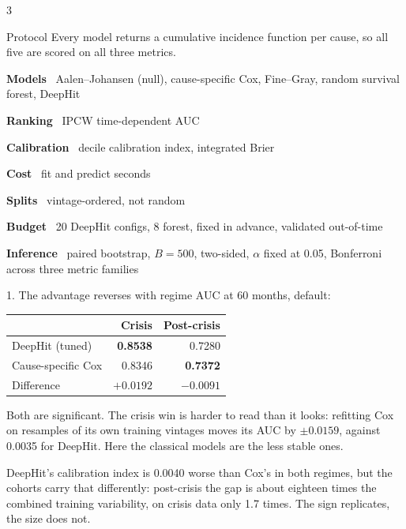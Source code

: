 \documentclass[final]{article}
\begin{document}
\begin{multicols}{3}
\begin{panel}{Protocol}
Every model returns a cumulative incidence function per cause, so all five are
scored on all three metrics.

\vspace{4mm}
\textbf{Models} \ Aalen--Johansen (null), cause-specific Cox, Fine--Gray, random
survival forest, DeepHit

\vspace{1mm}
\textbf{Ranking} \ IPCW time-dependent AUC

\vspace{1mm}
\textbf{Calibration} \ decile calibration index, integrated Brier

\vspace{1mm}
\textbf{Cost} \ fit and predict seconds

\vspace{1mm}
\textbf{Splits} \ vintage-ordered, not random

\vspace{1mm}
\textbf{Budget} \ 20 DeepHit configs, 8 forest, fixed in advance, validated
out-of-time

\vspace{1mm}
\textbf{Inference} \ paired bootstrap, $B{=}500$, two-sided, $\alpha$ fixed at
0.05, Bonferroni across three metric families
\end{panel}

\begin{panel}{1. The advantage reverses with regime}
AUC at 60 months, default:

\vspace{4mm}
\begin{tabular}{@{}lrr@{}}
\toprule
& Crisis & Post-crisis \\
\midrule
DeepHit (tuned) & \textbf{0.8538} & 0.7280 \\
Cause-specific Cox & 0.8346 & \textbf{0.7372} \\
\midrule
Difference & $+0.0192$ & $-0.0091$ \\
\bottomrule
\end{tabular}

\vspace{5mm}
Both are significant. The crisis win is harder to read than it looks: refitting
Cox on resamples of its own training vintages moves its AUC by $\pm0.0159$,
against 0.0035 for DeepHit. Here the classical models are the less stable ones.

\vspace{4mm}
DeepHit's calibration index is 0.0040 worse than Cox's in both regimes, but the
cohorts carry that differently: post-crisis the gap is about eighteen times the
combined training variability, on crisis data only 1.7 times. The sign
replicates, the size does not.
\end{panel}


\end{multicols}
\end{document}
